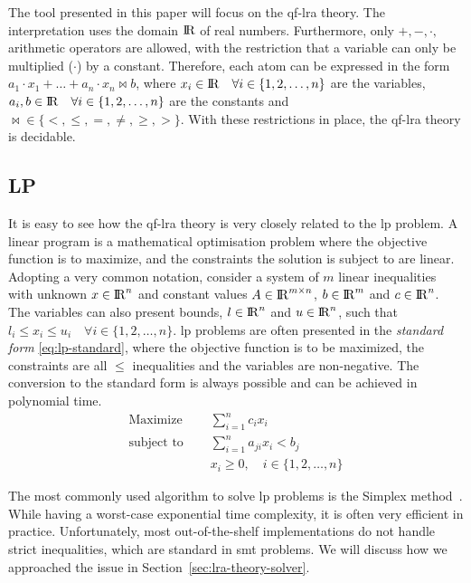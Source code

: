 \documentclass[runningheads]{llncs}
\begin{document}
The tool presented in this paper will focus on the \gls{qf-lra} theory.
The interpretation uses the domain ${\rm I\!R}$ of real numbers.
Furthermore, only $+, -, \cdot,$ arithmetic operators are allowed, with the restriction that a variable can only be multiplied ($\cdot$) by a constant.
Therefore, each atom can be expressed in the form $a_1 \cdot x_1 + \ldots + a_n \cdot x_n \bowtie b$, where $x_i \in {\rm I\!R} \quad \forall i \in \{1, 2, \dots, n\}$ are the variables, $a_i, b \in {\rm I\!R} \quad \forall i \in \{1, 2, \dots, n\}$ are the constants and $\bowtie \in \{<, \le, =, \ne, \ge, >\}$.
With these restrictions in place, the \gls{qf-lra} theory is decidable.

\subsection{LP}
\label{sec:lp}

It is easy to see how the \gls{qf-lra} theory is very closely related to the \gls{lp} problem.
A linear program is a mathematical optimisation problem where the objective function is to maximize, and the constraints the solution is subject to are linear.
Adopting a very common notation, consider a system of $m$ linear inequalities with unknown $x \in {\rm I\!R}^n$ and constant values $A \in {\rm I\!R}^{m \times n}$, $b \in {\rm I\!R}^m$ and $c \in {\rm I\!R}^n$.
The variables can also present bounds, $l \in {\rm I\!R}^n$ and $u \in {\rm I\!R}^n$, such that $l_i \le x_i \le u_i \quad \forall i \in \{1, 2, \ldots, n\}$.
\gls{lp} problems are often presented in the \textit{standard form} \eqref{eq:lp-standard}, where the objective function is to be maximized, the constraints are all $\le$ inequalities and the variables are non-negative.
The conversion to the standard form is always possible and can be achieved in polynomial time.
\begin{equation}
    \label{eq:lp-standard}
    \begin{split}
        \text{Maximize }   \quad & \sum_{i=1}^{n} c_i x_i                      \\
        \text{subject to } \quad & \sum_{i=1}^{n} a_{ji}x_{i} < b_j            \\
        & x_i \ge 0,  \quad i \in \{1, 2, \ldots, n\}
    \end{split}
\end{equation}

The most commonly used algorithm to solve \gls{lp} problems is the Simplex method~\cite{ref:simplex}.
While having a worst-case exponential time complexity, it is often very efficient in practice.
Unfortunately, most out-of-the-shelf implementations do not handle strict inequalities, which are standard in \gls{smt} problems.
We will discuss how we approached the issue in Section~\ref{sec:lra-theory-solver}.
\end{document}
